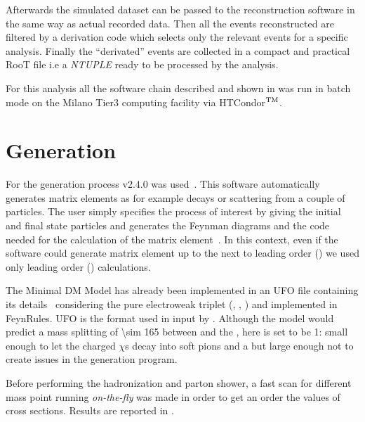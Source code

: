 Afterwards the simulated dataset can be passed to the reconstruction software in the same way as actual recorded data. Then all the events reconstructed are filtered by a derivation code which selects only the  relevant events for a specific analysis. Finally the ``derivated'' events are collected in a compact and practical RooT file i.e a \emph{NTUPLE} ready to be processed by the analysis.

For this analysis all the software chain described and shown in \Fig{\ref{fig:chain}} was run in batch mode on the Milano Tier3 computing facility via HTCondor$^{\textup{TM}}$.



\section{Generation}
For the generation process \MGMCatNLO v2.4.0 was used~\cite{madgraph}. This software automatically generates matrix elements as for example decays or scattering from a couple of particles. The user simply specifies the process of interest by giving the initial and final state particles and \MADGRAPH generates the Feynman diagrams and the code needed for the calculation of the matrix element~\cite{Pottgen:2016807}. In this context, even if the software could generate matrix element up to the next to leading order (\NLO) we used only leading order (\LO) calculations. 

The Minimal DM Model has already been implemented in an UFO file containing its details~\cite{mperego} considering the pure electroweak triplet (\chip\!, \chizero\!, \chim\!) and implemented in FeynRules. UFO is the format used in input by \MADGRAPH. Although the model would predict a mass splitting of \SI{\sim 165}{\mev} between \chipm and the \chizero, here is set to be \SI{1}{\gev}: small enough to let the charged $\chi$s decay into soft pions and a \chizero but large enough not to create issues in the generation program. 

Before performing the hadronization and parton shower, a fast scan for different mass point running \MADGRAPH \emph{on-the-fly} was made in order to get an order the values of cross sections. Results are reported in \Tab{\ref{tab:xsectheo}}.

